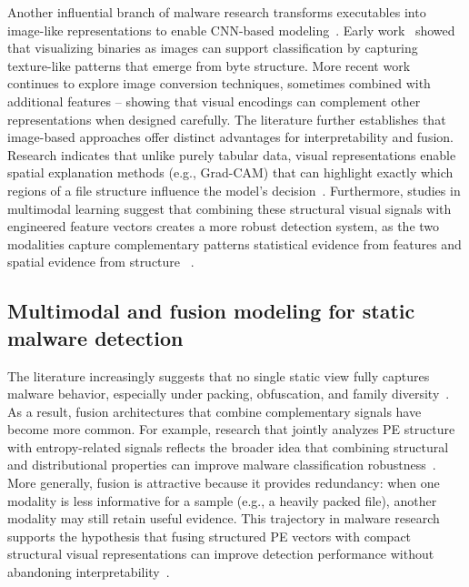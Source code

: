 \documentclass[conference]{IEEEtran}
\begin{document}
Another influential branch of malware research transforms executables into image-like representations to enable CNN-based modeling~\cite{NKJMB2011,KBSSSK2025}.
Early work~\cite{NKJMB2011} showed that visualizing binaries as images can support classification by capturing texture-like patterns that emerge from byte structure.
More recent work~\cite{ZLSC2024} continues to explore image conversion techniques, sometimes combined with additional features -- showing that visual encodings can complement other representations when designed carefully.
The literature further establishes that image-based approaches offer distinct advantages for interpretability and fusion.
Research indicates that unlike purely tabular data, visual representations enable spatial explanation methods (e.g., Grad-CAM) that can highlight exactly which regions of a file structure influence the model's decision~\cite{SCDVPB2017,ZLSC2024}.
Furthermore, studies in multimodal learning suggest that combining these structural visual signals with engineered feature vectors creates a more robust detection system, as the two modalities capture complementary patterns statistical evidence from features and spatial evidence from structure ~\cite{NKJMB2011,ZLSC2024}.

\subsection{Multimodal and fusion modeling for static malware detection}

The literature increasingly suggests that no single static view fully captures malware behavior, especially under packing, obfuscation, and family diversity~\cite{ZLSC2024,KBSSSK2025}.
As a result, fusion architectures that combine complementary signals have become more common.
For example, research that jointly analyzes PE structure with entropy-related signals reflects the broader idea that combining structural and distributional properties can improve malware classification robustness~\cite{SZS25}.
More generally, fusion is attractive because it provides redundancy: when one modality is less informative for a sample (e.g., a heavily packed file), another modality may still retain useful evidence.
This trajectory in malware research supports the hypothesis that fusing structured PE vectors with compact structural visual representations can improve detection performance without abandoning interpretability~\cite{SZS25,SCDVPB2017}.
\end{document}
